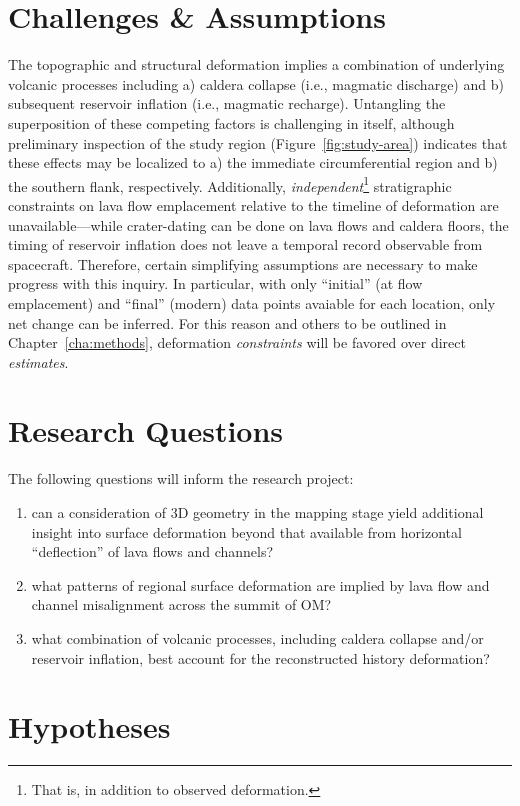 \section{Challenges \& Assumptions}
The topographic and structural deformation implies a combination of underlying volcanic processes including a) caldera collapse (i.e., magmatic discharge) and b) subsequent reservoir inflation (i.e., magmatic recharge). Untangling the superposition of these competing factors is challenging in itself, although preliminary inspection of the study region (Figure~\ref{fig:study-area}) indicates that these effects may be localized to a) the immediate circumferential region and b) the southern flank, respectively. Additionally, \textit{independent}\footnote{That is, in addition to observed deformation.} stratigraphic constraints on lava flow emplacement relative to the timeline of deformation are unavailable---while crater-dating can be done on lava flows and caldera floors, the timing of reservoir inflation does not leave a temporal record observable from spacecraft. Therefore, certain simplifying assumptions are necessary to make progress with this inquiry. In particular, with only ``initial'' (at flow emplacement) and ``final'' (modern) data points avaiable for each location, only net change can be inferred. For this reason and others to be outlined in Chapter~\ref{cha:methods}, deformation \textit{constraints} will be favored over direct \textit{estimates}.

\section{Research Questions}

The following questions will inform the research project: \begin{enumerate}
    \item can a consideration of 3D geometry in the mapping stage yield additional insight into surface deformation beyond that available from horizontal ``deflection'' of lava flows and channels?
    \item what patterns of regional surface deformation are implied by lava flow and channel misalignment across the summit of \ac{OM}?
    \item what combination of volcanic processes, including caldera collapse and/or reservoir inflation, best account for the reconstructed history deformation?
\end{enumerate}

\section{Hypotheses}

